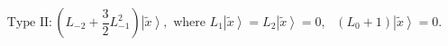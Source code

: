\begin{equation}
\text{Type II}:(L_{-2}+\frac{3}{2}L_{-1}^{2})\left\vert \widetilde{x}%
\right\rangle ,\text{ where }L_{1}\left\vert \widetilde{x}\right\rangle
=L_{2}\left\vert \widetilde{x}\right\rangle =0,\text{ }(L_{0}+1)\left\vert 
\widetilde{x}\right\rangle =0.
\end{equation}%
